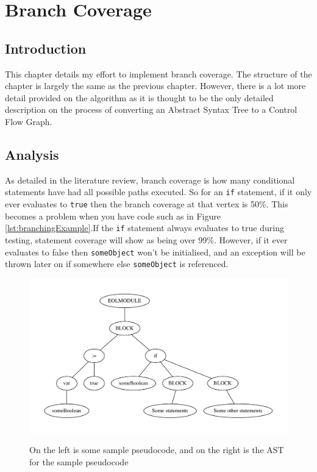 \chapter{Branch Coverage}

\section{Introduction}
This chapter details my effort to implement branch coverage. The structure of the chapter is largely the same as the previous chapter. However, there is a lot more detail provided on the algorithm as it is thought to be the only detailed description on the process of converting an Abstract Syntax Tree to a Control Flow Graph.

\section{Analysis}

As detailed in the literature review, branch coverage is how many conditional statements have had all possible paths executed. So for an \verb|if| statement, if it only ever evaluates to \verb|true| then the branch coverage at that vertex is 50\%. This becomes a problem when you have code such as in Figure \ref{lst:branchingExample}.If the \verb|if| statement always evaluates to true during testing, statement coverage will show as being over 99\%. However, if it ever evaluates to false then \verb|someObject| won't be initialised, and an exception will be thrown later on if somewhere else \verb|someObject| is referenced.

\begin{figure}
\centering
\begin{minipage}{.33\textwidth}
  \centering
  
  \label{lst:branchingExample}
\end{minipage}%
\begin{minipage}{.5\textwidth}
  \centering
  \includegraphics[scale=0.5]{figures/branchSampleAST.pdf}
  \label{fig:branchExampleAST}
\end{minipage}
\caption{On the left is some sample pseudocode, and on the right is the AST for the sample pseudocode}
\end{figure}

